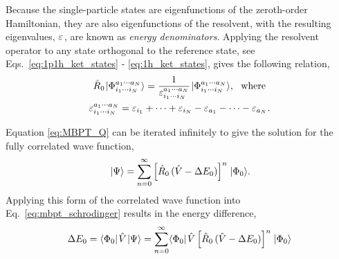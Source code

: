 \documentclass[thesis.tex]{subfiles}
\begin{document}
Because the single-particle states are eigenfunctions of the zeroth-order Hamiltonian, they are also eigenfunctions of the resolvent, with the resulting eigenvalues, $\varepsilon^{}_{}$, are known as \textit{energy denominators}.  Applying the resolvent operator to any state orthogonal to the reference state, see Eqs.\ \eqref{eq:1p1h_ket_states} - \eqref{eq:1h_ket_states}, gives the following relation,
\begin{gather} \label{eq:energy_denominators}
  \hat{R}_{0}\hspace{1pt}\lvert \Phi^{a_{1}\cdots a_{N}}_{i_{1}\cdots i_{N}} \rangle = \frac{1}{\varepsilon^{a_{1}\cdots a_{N}}_{i_{1}\cdots i_{N}}}\hspace{1pt}\lvert \Phi^{a_{1}\cdots a_{N}}_{i_{1}\cdots i_{N}} \rangle,\ \ \text{where} \notag \\
  \varepsilon^{a_{1}\cdots a_{N}}_{i_{1}\cdots i_{N}} = \varepsilon_{i_{1}} + \cdots + \varepsilon_{i_{N}} - \varepsilon_{a_{1}} - \cdots - \varepsilon_{a_{N}}.
\end{gather}

Equation \eqref{eq:MBPT_Q} can be iterated infinitely to give the solution for the fully correlated wave function,
\begin{equation} \label{eq:MBPT_wave1}
  \hspace{1pt}\lvert \Psi \rangle = \sum_{n=0}^{\infty}\left[\hat{R}_{0}\mathop{(\hat{V} - \Delta E_{0})}\right]^{n}\hspace{1pt}\lvert \Phi_{0} \rangle.
\end{equation}
Applying this form of the correlated wave function into Eq.\ \eqref{eq:mbpt_schrodinger} results in the energy difference,
\begin{equation} \label{eq:MBPT_energy1}
  \Delta E_{0} = \langle \Phi_{0} |\hspace{1pt}\hat{V}\hspace{1pt}\lvert \Psi \rangle = \sum_{n=0}^{\infty}\langle \Phi_{0} |\hspace{1pt}\hat{V}\left[\hat{R}_{0}\mathop{(\hat{V} - \Delta E_{0})}\right]^{n}\hspace{1pt}\lvert \Phi_{0} \rangle
\end{equation}
\end{document}
